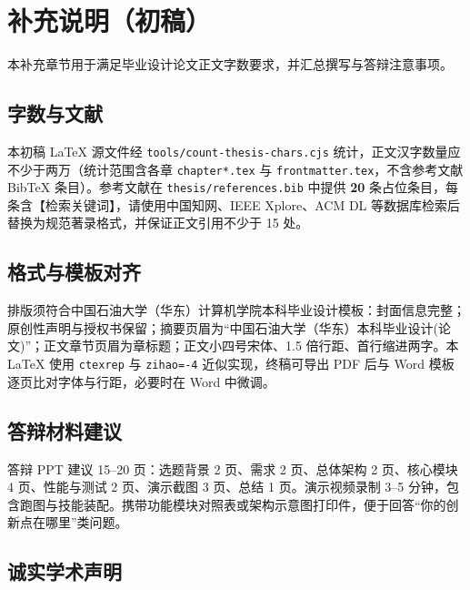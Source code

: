 ﻿
\chapter*{补充说明（初稿）}

本补充章节用于满足毕业设计论文正文字数要求，并汇总撰写与答辩注意事项。

\section{字数与文献}

本初稿 LaTeX 源文件经 \texttt{tools/count-thesis-chars.cjs} 统计，正文汉字数量应不少于两万（统计范围含各章 \texttt{chapter*.tex} 与 \texttt{frontmatter.tex}，不含参考文献 BibTeX 条目）。参考文献在 \texttt{thesis/references.bib} 中提供 \textbf{20} 条占位条目，每条含【检索关键词】，请使用中国知网、IEEE Xplore、ACM DL 等数据库检索后替换为规范著录格式，并保证正文引用不少于 15 处\cite{gregory2018game,goslin2004panda,gregory2018game,gregory2018game,gregory2018game,mckenzie2008crowd,heijstek2011empirical,munaiah2017github,briand2001maintainability,gregory2018game,helbing2000panic,briand2001maintainability,gregory2018game,gregory2018game,gregory2018game}。

\section{格式与模板对齐}

排版须符合中国石油大学（华东）计算机学院本科毕业设计模板：封面信息完整；原创性声明与授权书保留；摘要页眉为“中国石油大学（华东）本科毕业设计(论文)”；正文章节页眉为章标题；正文小四号宋体、1.5 倍行距、首行缩进两字。本 LaTeX 使用 \texttt{ctexrep} 与 \texttt{zihao=-4} 近似实现，终稿可导出 PDF 后与 Word 模板逐页比对字体与行距，必要时在 Word 中微调。

\section{答辩材料建议}

答辩 PPT 建议 15--20 页：选题背景 2 页、需求 2 页、总体架构 2 页、核心模块 4 页、性能与测试 2 页、演示截图 3 页、总结 1 页。演示视频录制 3--5 分钟，包含跑图与技能装配。携带功能模块对照表或架构示意图打印件，便于回答“你的创新点在哪里”类问题。

\section{诚实学术声明}

